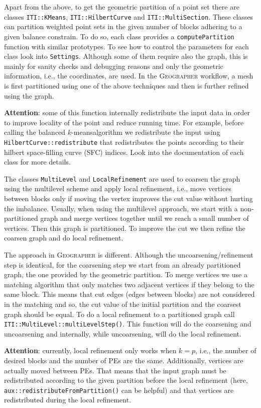 \documentclass[a4paper,10pt]{article}
\newcommand{\geo}{\textsc{Geographer} }
\newcommand{\km}{$k$-means}
\newcommand{\att}{\textbf{Attention}: }
\newcommand{\MI}[1]{\texttt{#1}}
\begin{document}
Apart from the above, to get the geometric partition of a point set there are classes \MI{ITI::KMeans},
\MI{ITI::HilbertCurve} and \MI{ITI::MultiSection}. These classes can partition weighted point sets in the given
number of blocks adhering to a given balance constrain. To do so, each class provides a 
\MI{computePartition} function with similar prototypes. To see how to control the parameters for
each class look into \MI{Settings}. Although some of them require also the
graph, this is mainly for sanity checks and debugging reasons and only the geometric information,
i.e., the coordinates,
are used. In the \geo workflow, a mesh is first partitioned using one of the above techniques and
then is further refined using the graph.

\att some of this function internally redistribute the input data in order to improve locality of the
point and reduce running time. For example, before calling the balanced \km algorithm we redistribute
the input using \MI{HilbertCurve::redistribute} that redistributes the points according to their
hilbert space-filling curve (SFC) indices. Look into the documentation of each class for more details.

The classes \MI{MultiLevel} and \MI{LocalRefinement} are used to coarsen the graph using the
multilevel scheme and apply local refinement, i.e., move vertices between blocks only if moving
the vertex improves the cut value without hurting the imbalance.
Usually, when using the multilevel approach, we start with a non-partitioned graph and merge vertices
together until we reach a small number of vertices. Then this graph is partitioned. To improve
the cut we then refine the coarsen graph and do local refinement.

The approach in \geo is different.
Although the uncoarsening/refinement step is identical, for the coarsening step we start from an
already partitioned graph, the one provided by the geometric partition. To merge vertices we
use a matching algorithm that only matches two adjacent vertices if they belong to the same block.
This means that cut edges (edges between blocks) are not considered in the matching and so, the cut 
value of the initial partition and the coarsest graph should be equal.
To do a local refinement to a partitioned graph call \MI{ITI::MultiLevel::multiLevelStep()}. 
This function will do the coarsening and uncoarsening and internally, while uncoarsening,
will do the local refinement.

\att currently, local refinement only works when $k=p$, i.e., the number of desired blocks and the
number of PEs are the same. Additionally, vertices are actually moved between PEs. That means
that the input graph must be redistributed according to the given partition before the local refinement
(here, \MI{aux::redistributeFromPartition()} can be helpful)
and that vertices are redistributed during the local refinement.
\end{document}
